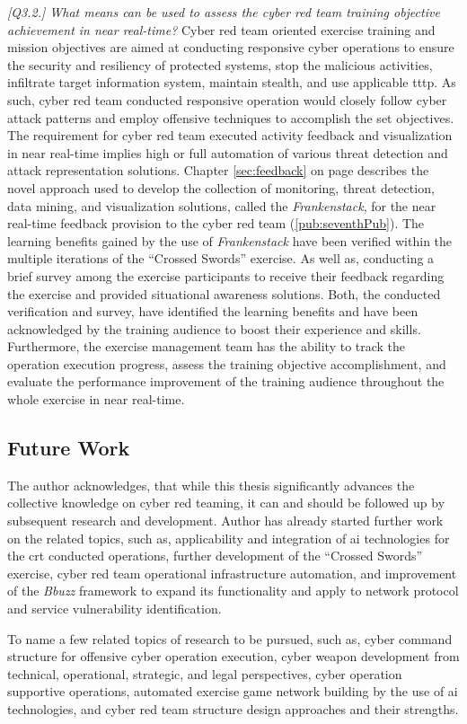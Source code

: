 \textit{[Q3.2.] What means can be used to assess the cyber red team training objective achievement in near real-time?}
Cyber red team oriented exercise training and mission objectives are aimed at conducting responsive cyber operations to ensure the security and resiliency of protected systems, stop the malicious activities, infiltrate target information system, maintain stealth, and use applicable \gls{tttp}. As such, cyber red team conducted responsive operation would closely follow cyber attack patterns and employ offensive techniques to accomplish the set objectives. 
The requirement for cyber red team executed activity feedback and visualization in near real-time implies high or full automation of various threat detection and attack representation solutions.
Chapter \ref{sec:feedback} on page \pageref{sec:feedback} describes the novel approach used to develop the collection of monitoring, threat detection, data mining, and visualization solutions, called the \textit{Frankenstack}, for the near real-time feedback provision to the cyber red team (\ref{pub:seventhPub}). The learning benefits gained by the use of \textit{Frankenstack} have been verified within the multiple iterations of the ``Crossed Swords'' exercise. As well as, conducting a brief survey among the exercise participants to receive their feedback regarding the exercise and provided situational awareness solutions. Both, the conducted verification and survey, have identified the learning benefits and have been acknowledged by the training audience to boost their experience and skills. Furthermore, the exercise management team has the ability to track the operation execution progress, assess the training objective accomplishment, and evaluate the performance improvement of the training audience throughout the whole exercise in near real-time.


\subsection{Future Work}
The author acknowledges, that while this thesis significantly advances the collective knowledge on cyber red teaming, it can and should be followed up by subsequent research and development.
Author has already started further work on the related topics, such as, applicability and integration of \gls{ai} technologies for the \gls{crt} conducted operations, further development of the ``Crossed Swords'' exercise, cyber red team operational infrastructure automation, and improvement of the \textit{Bbuzz} framework to expand its functionality and apply to network protocol and service vulnerability identification.

To name a few related topics of research to be pursued, such as, cyber command structure for offensive cyber operation execution, cyber weapon development from technical, operational, strategic, and legal perspectives, cyber operation supportive operations, automated exercise game network building by the use of \gls{ai} technologies, and cyber red team structure design approaches and their strengths.
